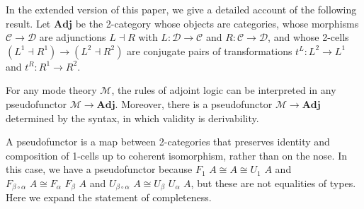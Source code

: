 \documentclass{drl-common/llncs}
\newcommand{\C}{\ensuremath{\mathcal{C}}}
\newcommand{\D}{\ensuremath{\mathcal{D}}}
\newcommand{\M}{\ensuremath{\mathcal{M}}}
\newcommand{\la}{\ensuremath{\dashv}}
\newcommand{\Adj}{\textbf{Adj}}
\newcommand\compo[2]{\ensuremath{#1 \circ #2}}
\renewcommand\wftp[2]{\ensuremath{#1 \,\,\, \dsd{type}_{#2}}}
\newcommand\F[2]{\ensuremath{F_{#1} \,\, #2}}
\newcommand\U[2]{\ensuremath{U_{#1} \,\, #2}}
\newcommand\seq[3]{\ensuremath{#1 \, [ #2 ] \, \vdash \, #3}}
\newcommand\ident[1]{\ensuremath{\dsd{ident}_{#1}}}
\newcommand\cutsym{\ensuremath{\dsd{cut}}}
\newcommand\cut[2]{\ensuremath{{\cutsym \,\, #1 \,\, #2}}}
\newcommand\cuti{\ensuremath{\bullet}}
\newcommand\ap[2]{\ensuremath{#1 \approx #2}}
\newcommand\iso{\cong}
\begin{document}
In the extended version of this paper, we give a detailed account of
the following result.  Let $\Adj$ be the 2-category whose
objects are categories, whose morphisms $\C\to\D$ are
adjunctions $L \la R$ with $L:\D\to \C$ and $R:\C\to\D$, and whose
2-cells $(L^1 \la R^1)\to (L^2 \la R^2)$ are conjugate pairs of
transformations $t^L : L^2 \to L^1$ and $t^R : R^1 \to R^2$.

\begin{theorem}
For any mode theory \M, the rules of adjoint logic can be interpreted in
any pseudofunctor $\M \to \Adj$.
Moreover, there is a pseudofunctor $\M \to \Adj$ determined by the
syntax, in which validity is derivability.
\end{theorem}
A pseudofunctor is a map between 2-categories that preserves identity
and composition of 1-cells up to coherent isomorphism, rather than on
the nose. In this case, we have a pseudofunctor because $\F 1 A \iso A
\iso \U 1 A$ and $\F{\compo{\beta}{\alpha}}{A} \iso
\F{\alpha}{\F{\beta}{A}}$ and $\U{\compo{\beta}{\alpha}}{A} \iso
\U{\beta}{\U{\alpha}{A}}$, but these are not equalities of types.  Here
we expand the statement of completeness.



\end{document}
